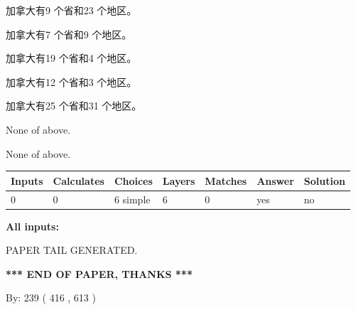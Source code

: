 \documentclass{ctexart}
\begin{document}
 
加拿大有9 个省和23 个地区。
 
 
加拿大有7 个省和9 个地区。
 
 
加拿大有19 个省和4 个地区。
 
 
加拿大有12 个省和3 个地区。
 
 
加拿大有25 个省和31 个地区。
 
 
 None of above.
 
 
\noindent{}
 
 
 None of above.
 
 
\noindent{}
 
 
   
   
   
   
\noindent\begin{tabular}{|l|l|l|l|l|l|l|}
 \hline
Inputs & Calculates & Choices & Layers & Matches & Answer & Solution \\ \hline
 0  & 
 0  & 
 6
  simple  
  & 
 6  & 
 0  & 
  yes & 
  no 
  \\ \hline
 \end{tabular}
   
   
   
   
\noindent{}
   
   
   
   
\noindent\vspace{0.1in}\hspace{-0.08in} {\textbf{\Large{All inputs: }}}
   
   
   
   
   
   
 \vspace{0.2in}
 
   
   
\vspace{2.0in} PAPER TAIL GENERATED.
   
   
   
   
\vspace{1.0in} 
{\textbf{\large{ *** END OF PAPER, THANKS *** }}} 
   
   
\hspace{1.0in} By: 
 239 ( 416 ,  613 )
   
\end{document}
